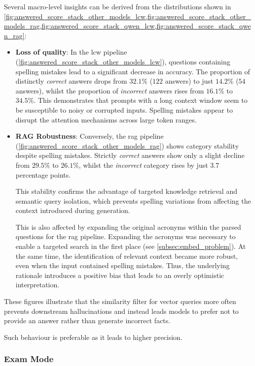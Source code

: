 Several macro-level insights can be derived from the distributions shown in \cref{fig:answered_score_stack_other_models_lcw,fig:answered_score_stack_other_models_rag,fig:answered_score_stack_qwen_lcw,fig:answered_score_stack_qwen_rag}:
\begin{itemize}
    \item \textbf{Loss of quality}:
    In the \ac{lcw} pipeline (\cref{fig:answered_score_stack_other_models_lcw}), questions containing spelling mistakes lead to a significant decrease in accuracy.
    The proportion of distinctly \textit{correct} answers drops from $32.1\%$ ($122$ answers) to just $14.2\%$ ($54$ answers), whilst the proportion of \textit{incorrect} answers rises from $16.1\%$ to $34.5\%$.
    This demonstrates that prompts with a long context window seem to be susceptible to noisy or corrupted inputs.
    Spelling mistakes appear to disrupt the attention mechanisms across large token ranges.
    \item \textbf{RAG Robustness}: Conversely, the \ac{rag} pipeline (\cref{fig:answered_score_stack_other_models_rag}) shows category stability despite spelling mistakes.
    Strictly \textit{correct} answers show only a slight decline from $29.5\%$ to $26.1\%$, whilst the \textit{incorrect} category rises by just $3.7$ percentage points.
    
    This stability confirms the advantage of targeted knowledge retrieval and semantic query isolation, which prevents spelling variations from affecting the context introduced during generation.

    This is also affected by expanding the original acronyms within the parsed questions for the \ac{rag} pipeline.
    Expanding the acro\-nyms was necessary to enable a targeted search in the first place (see \cref{subsec:embed_problem}).
    At the same time, the identification of relevant context became more robust, even when the input contained spelling mistakes.
    Thus, the underlying rationale introduces a positive bias that leads to an overly optimistic interpretation.
    
    
\end{itemize}
%
These figures illustrate that the similarity filter for vector queries more often prevents downstream hallucinations and instead leads models to prefer not to provide an answer rather than generate incorrect facts.

Such behaviour is preferable as it leads to higher precision.

\subsubsection{Exam Mode}\label{subsub:exam_mode_correctness}

